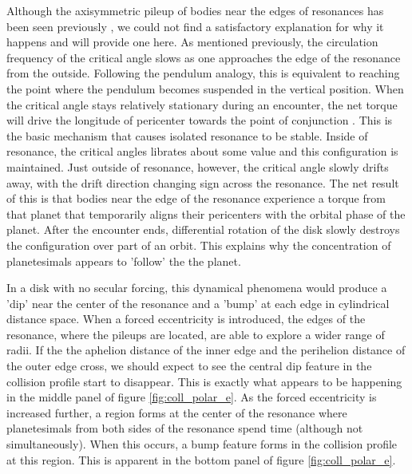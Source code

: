 \documentclass[onecolumn]{aastex63}
\begin{document}
Although the axisymmetric pileup of bodies near the edges of resonances has been seen previously \citep{2000Icar..143...45R, 2016ApJ...818..159T}, we could not find a satisfactory explanation for why it happens and will provide one here. As mentioned previously, the circulation frequency of the critical angle slows as one approaches the edge of the resonance from the outside. Following the pendulum analogy, this is equivalent to reaching the point where the pendulum becomes suspended in the vertical position. When the critical angle stays relatively stationary during an encounter, the net torque will drive the longitude of pericenter towards the point of conjunction \citep{1976ARA&A..14..215P}.  This is the basic mechanism that causes isolated resonance to be stable. Inside of resonance, the critical angles librates about some value and this configuration is maintained. Just outside of resonance, however, the critical angle slowly drifts away, with the drift direction changing sign across the resonance. The net result of this is that bodies near the edge of the resonance experience a torque from that planet that temporarily aligns their pericenters with the orbital phase of the planet. After the encounter ends, differential rotation of the disk slowly destroys the configuration over part of an orbit. This explains why the concentration of planetesimals appears to 'follow' the the planet.

In a disk with no secular forcing, this dynamical phenomena would produce a 'dip' near the center of the resonance and a 'bump' at each edge in cylindrical distance space. When a forced eccentricity is introduced, the edges of the resonance, where the pileups are located, are able to explore a wider range of radii. If the the aphelion distance of the inner edge and the perihelion distance of the outer edge cross, we should expect to see the central dip feature in the collision profile start to disappear. This is exactly what appears to be happening in the middle panel of figure \ref{fig:coll_polar_e}. As the forced eccentricity is increased further, a region forms at the center of the resonance where planetesimals from both sides of the resonance spend time (although not simultaneously). When this occurs, a bump feature forms in the collision profile at this region. This is apparent in the bottom panel of figure \ref{fig:coll_polar_e}.
\end{document}
